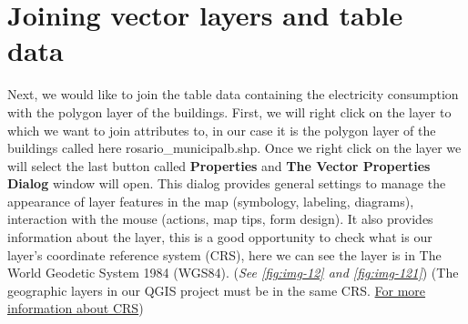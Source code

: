 \documentclass[
]{book}
\begin{document}
\hypertarget{joining-vector-layers-and-table-data}{%
\section{Joining vector layers and table data}\label{joining-vector-layers-and-table-data}}

Next, we would like to join the table data containing the electricity consumption with the polygon layer of the buildings.
First, we will right click on the layer to which we want to join attributes to, in our case it is the polygon layer of the buildings called here {rosario\_municipalb.shp}. Once we right click on the layer we will select the last button called \textbf{Properties} and \textbf{The Vector Properties Dialog} window will open. This dialog provides general settings to manage the appearance of layer features in the map (symbology, labeling, diagrams), interaction with the mouse (actions, map tips, form design). It also provides information about the layer, this is a good opportunity to check what is our layer's coordinate reference system (CRS), here we can see the layer is in The World Geodetic System 1984 (WGS84). (\emph{See \ref{fig:img-12} and \ref{fig:img-121}}) (The geographic layers in our QGIS project must be in the same CRS. \href{https://en.wikipedia.org/wiki/Spatial_reference_system}{For more information about CRS})
\end{document}
